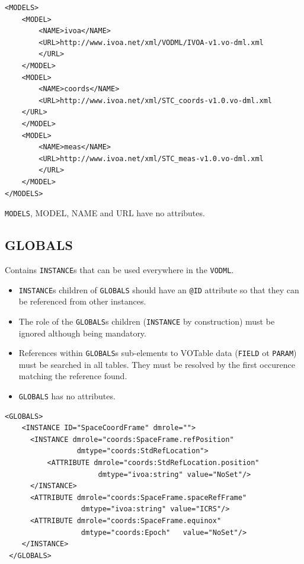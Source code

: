 \documentclass[11pt,a4paper]{ivoa}
\begin{document}
\begin{lstlisting}[caption={GLOBALS block example},style=XML]
<MODELS>
    <MODEL>
        <NAME>ivoa</NAME>
        <URL>http://www.ivoa.net/xml/VODML/IVOA-v1.vo-dml.xml
        </URL>
    </MODEL>
    <MODEL>
        <NAME>coords</NAME>
        <URL>http://www.ivoa.net/xml/STC_coords-v1.0.vo-dml.xml
    </URL>
    </MODEL>
    <MODEL>
        <NAME>meas</NAME>
        <URL>http://www.ivoa.net/xml/STC_meas-v1.0.vo-dml.xml
        </URL>
    </MODEL>
</MODELS>
\end{lstlisting}

 \texttt{MODELS},  {MODEL},  {NAME} and {URL}  have no attributes. 
 

%
%
\subsection{GLOBALS}
 Contains  \texttt{INSTANCE}s  that can be used everywhere in the \texttt{VODML}.
\begin{itemize}
    \item \texttt{INSTANCE}s children of \texttt{GLOBALS} should have an  \texttt{@ID} attribute so that they can be referenced from other instances.
    \item The role of the \texttt{GLOBALS}s children (\texttt{INSTANCE} by construction) must be ignored although being mandatory.
    \item References within \texttt{GLOBALS}s  sub-elements to VOTable data (\texttt{FIELD} ot \texttt{PARAM}) must be searched in all tables. 
            They must be resolved by the first occurence matching the reference found.
    \item \texttt{GLOBALS} has no attributes. 
\end{itemize}

\begin{lstlisting}[caption={GLOBALS block example},style=XML]
  <GLOBALS>
    <INSTANCE ID="SpaceCoordFrame" dmrole="">
      <INSTANCE dmrole="coords:SpaceFrame.refPosition" 
                 dmtype="coords:StdRefLocation">
          <ATTRIBUTE dmrole="coords:StdRefLocation.position" 
                      dmtype="ivoa:string" value="NoSet"/>
      </INSTANCE>
      <ATTRIBUTE dmrole="coords:SpaceFrame.spaceRefFrame" 
                  dmtype="ivoa:string" value="ICRS"/>
      <ATTRIBUTE dmrole="coords:SpaceFrame.equinox" 
                  dmtype="coords:Epoch"   value="NoSet"/>
    </INSTANCE>
 </GLOBALS>
\end{lstlisting}
\end{document}
